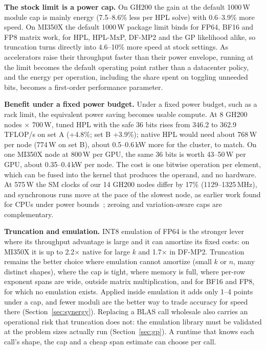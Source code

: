 \documentclass[conference]{IEEEtran}
\newcommand{\W}{\,W}
\newcommand{\pct}{\%}
\begin{document}
\textbf{The stock limit is a power cap.} On GH200 the gain at the default 1000\W{} module cap is mainly energy
(7.5--8.6\pct{} less per HPL solve) with 0.6--3.9\pct{} more speed. On MI350X the default 1000\W{} package limit binds for
FP64, BF16 and FP8 matrix work, for HPL, HPL-MxP, DF-MP2 and the GP likelihood alike, so truncation turns directly into
4.6--10\pct{} more speed at stock settings. As accelerators raise their throughput faster than their power envelope,
running at the limit becomes the default operating point rather than a datacenter policy, and the energy per operation,
including the share spent on toggling unneeded bits, becomes a first-order performance parameter.

\textbf{Benefit under a fixed power budget.} Under a fixed power budget, such as a rack limit, the equivalent power
saving becomes usable compute. At 8 GH200 nodes $\times$ 700\W, tuned HPL with the safe 36 bits rises from 346.2 to
362.9\,TFLOP/s on set A (+4.8\pct; set B +3.9\pct); native HPL would need about 768\W{} per node (774\W{} on set B),
about 0.5--0.6\,kW more for the cluster, to match. On one MI350X node at 800\W{} per GPU, the same 36 bits is worth
43--50\W{} per GPU, about 0.35--0.4\,kW per node. The cost is one bitwise operation per element, which can be fused
into the kernel that produces the operand, and no hardware. At 575\W{} the SM clocks of our 14 GH200 nodes differ by
17\pct{} (1129--1325\,MHz), and synchronous runs move at the pace of the slowest node, as earlier work found for CPUs
under power bounds~\cite{Rountree2012,Inadomi2015}; zeroing and variation-aware caps are complementary.

\textbf{Truncation and emulation.} INT8 emulation of FP64 is the stronger lever where its throughput advantage is
large and it can amortize its fixed costs: on MI350X it is up to 2.2$\times$ native for large $k$ and 1.7$\times$ in DF-MP2.
Truncation remains the better choice where emulation cannot amortize (small $k$ or $n$, many distinct shapes), where the
cap is tight, where memory is full, where per-row exponent spans are wide, outside matrix multiplication, and for BF16
and FP8, for which no emulation exists. Applied inside emulation it adds only 1--4 points under a cap, and fewer
moduli are the better way to trade accuracy for speed there (Section~\ref{sec:synergy}). Replacing a BLAS call
wholesale also carries an operational risk that truncation does not: the emulation library must be validated at the
problem sizes actually run (Section~\ref{sec:gp}). A runtime that knows each call's shape, the cap and a cheap span estimate can choose per call.
\end{document}
